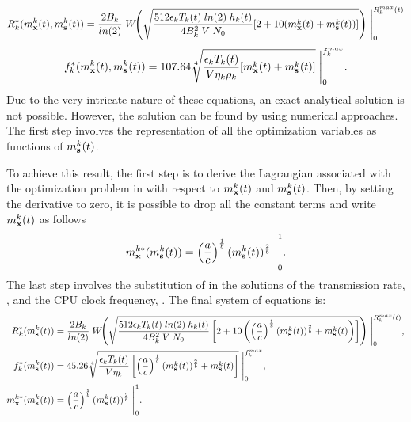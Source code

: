 \begin{equation}
    R_k^*(m_{\mathbf{x}}^k(t), m_{\mathbf{s}}^k(t)) = \frac{2 B_k}{ln(2)}\; W\! \!\left(\sqrt{\frac{512\epsilon_k T_k(t)\; ln(2)\; h_k(t)}{4B_k^2\;V \;N_0} [2+ 10(m_{\mathbf{x}}^k(t) + m_{\mathbf{s}}^k(t))] }\right)\; \Biggr|_0^{R_k^{max}(t)}
\label{eq: EN_nn optimal rate masks_func}
\end{equation}
\begin{equation}
    f_k^* (m_{\mathbf{x}}^k(t), m_{\mathbf{s}}^k(t)) = 107.64\sqrt[4]{\frac{\epsilon_k T_k(t)}{V \eta_k \rho_k} [m_{\mathbf{x}}^k(t) + m_{\mathbf{s}}^k(t)]}\; \Biggr|_0^{f_k^{max}}.
\label{eq: EN_nn optimal freq device masks_func}    
\end{equation}
Due to the very intricate nature of these equations, an exact analytical solution is not possible. However, the solution can be found by using numerical approaches. The first step involves the representation of all the optimization variables as functions of $m_{\mathbf{s}}^k(t)$.

To achieve this result, the first step is to derive the Lagrangian associated with the optimization problem in  with respect to $m_{\mathbf{x}}^k(t)$ and $m_{\mathbf{s}}^k(t)$. Then, by setting the derivative to zero, it is possible to drop all the constant terms and write $m_{\mathbf{x}}^k(t)$ as follows
\begin{equation}
    m_{\mathbf{x}}^{k*}(m_{\mathbf{s}}^k(t)) = \left(\frac{a}{c}\right)^{\frac{1}{b}} (m_{\mathbf{s}}^k(t))^{\frac{2}{b}}\; \Biggr|_0^{1}.
    \label{eq: EN_nn optimal m_x masks_func}
\end{equation}
The last step involves the substitution of  in the solutions of the transmission rate, , and the CPU clock frequency, . The final system of equations is:
\begin{align}
    R_k^*(m_{\mathbf{s}}^k(t)) &= \frac{2 B_k}{ln(2)}\; W\! \!\left(\sqrt{\frac{512\epsilon_k T_k(t)\; ln(2)\; h_k(t)}{4B_k^2\;V \;N_0} \left[2+ 10\left( \left(\frac{a}{c}\right)^{\frac{1}{b}} (m_{\mathbf{s}}^k(t))^{\frac{2}{b}} + m_{\mathbf{s}}^k(t)\right)\right] }\right)\; \Biggr|_0^{R_k^{max}(t)}, \label{eq: EN_nn optimal rate}\\
    f_k^* (m_{\mathbf{s}}^k(t)) &= 45.26\sqrt[4]{\frac{\epsilon_k T_k(t)}{V \eta_k} \left[\left(\frac{a}{c}\right)^{\frac{1}{b}} (m_{\mathbf{s}}^k(t))^{\frac{2}{b}} + m_{\mathbf{s}}^k(t)\right]}\; \Biggr|_0^{f_k^{max}}, \label{eq: EN_nn optimal freq device}\\
    m_{\mathbf{x}}^{k*}(m_{\mathbf{s}}^k(t)) &= \left(\frac{a}{c}\right)^{\frac{1}{b}} (m_{\mathbf{s}}^k(t))^{\frac{2}{b}}\; \Biggr|_0^{1}. \label{eq: EN_nn optimal m_x}
\end{align}

